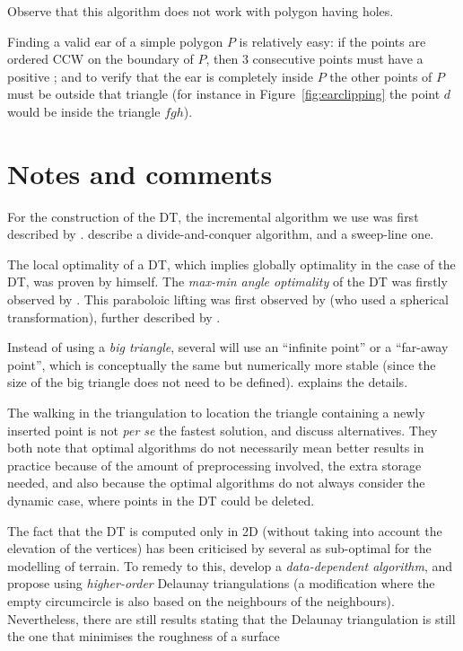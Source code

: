 Observe that this algorithm does not work with polygon having holes.

Finding a valid ear of a simple polygon $P$ is relatively easy: if the points are ordered CCW on the boundary of $P$, then 3 consecutive points must have a positive \Orient; and to verify that the ear is completely inside $P$ the other points of $P$ must be outside that triangle (for instance in Figure~\ref{fig:earclipping} the point $d$ would be inside the triangle $fgh$).


%
\section{Notes and comments}
\label{sec:notes}

For the construction of the DT, the incremental algorithm we use was first described by \citet{Lawson72-1}.
\citet{Guibas85} describe a divide-and-conquer algorithm, and \citet{Fortune87} a sweep-line one.

The local optimality of a DT, which implies globally optimality in the case of the DT, was proven by \citet{Delaunay34} himself.
The \emph{max-min angle optimality} of the DT was firstly observed by \citet{Sibson78}.
This paraboloic lifting was first observed by \citet{Brown79} (who used a spherical transformation), further described by \citet{Seidel82,Edelsbrunner86}. 

Instead of using a \emph{big triangle}, several will use an ``infinite point'' or a ``far-away point'', which is conceptually the same but numerically more stable (since the size of the big triangle does not need to be defined).
\citet{Liu05-1} explains the details.

The walking in the triangulation to location the triangle containing a newly inserted point is not \emph{per se} the fastest solution, \citet{Mucke99} and \citet{Devillers02} discuss alternatives.
They both note that optimal algorithms do not necessarily mean better results in practice because of the amount of preprocessing involved, the extra storage needed, and also because the optimal algorithms do not always consider the dynamic case, where points in the DT could be deleted. 

The fact that the DT is computed only in 2D (without taking into account the elevation of the vertices) has been criticised by several as sub-optimal for the modelling of terrain.
To remedy to this, \citet{Dyn90} develop a \emph{data-dependent algorithm}, and \citet{Gudmundsson02} propose using \emph{higher-order} Delaunay triangulations (a modification where the empty circumcircle is also based on the neighbours of the neighbours).
Nevertheless, there are still results stating that the Delaunay triangulation is still the one that minimises the roughness of a surface~\citep{Wang01,Rippa90}

